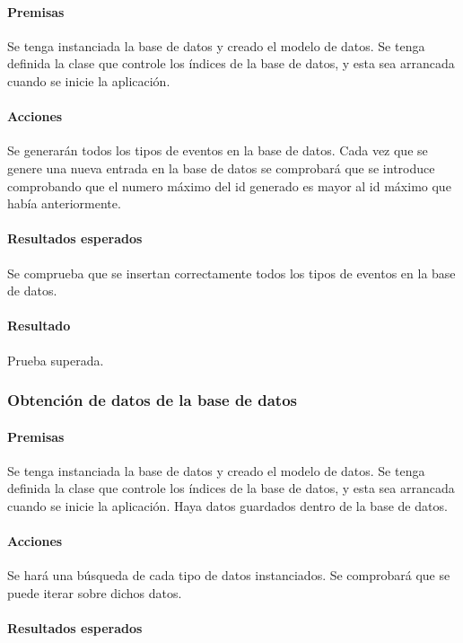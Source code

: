 \paragraph{Premisas}
Se tenga instanciada la base de datos y creado el modelo de datos.
Se tenga definida la clase que controle los índices de la base de datos, y esta sea arrancada cuando se inicie la aplicación.

\paragraph{Acciones}
Se generarán todos los tipos de eventos en la base de datos.
Cada vez que se genere una nueva entrada en la base de datos se comprobará que se introduce comprobando que el numero máximo del id generado es mayor al id máximo que había anteriormente.

\paragraph{Resultados esperados}

Se comprueba que se insertan correctamente todos los tipos de eventos en la base de datos.

\paragraph{Resultado}
Prueba superada.

\subsubsection{Obtención de datos de la base de datos}

\paragraph{Premisas}
Se tenga instanciada la base de datos y creado el modelo de datos.
Se tenga definida la clase que controle los índices de la base de datos, y esta sea arrancada cuando se inicie la aplicación.
Haya datos guardados dentro de la base de datos.

\paragraph{Acciones}
Se hará una búsqueda de cada tipo de datos instanciados.
Se comprobará que se puede iterar sobre dichos datos.

\paragraph{Resultados esperados}

